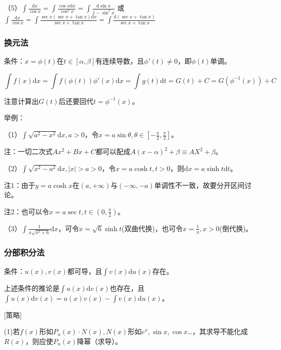 \documentclass{SCIS2020cn}
\begin{document}
（5）$\displaystyle\int{\frac{\text{d}x}{\cos{x}}}=\int{\frac{\cos{x}\text{d}x}{\cos^2{x}}}=\int{\frac{\text{d}\sin{x}}{1-\sin^2{x}}}$
或$\displaystyle\int{\frac{\text{d}x}{\cos{x}}}=\int{\frac{\sec{x}(\sec{x}+\tan{x})\text{d}x}{\sec{x}+\tan{x}}}=\int{\frac{\text{d}(\sec{x}+\tan{x})}{\sec{x}+\tan{x}}}$

\subsubsection{换元法}
条件：$x=\phi(t)$在$t\in[\alpha{},\beta{}]$有连续导数，且$\phi'(t)\neq{}0$，即$\phi(t)$单调。

\begin{equation}
\int{f(x)\text{d}x}=\int{f(\phi(t))\phi'(x)\text{d}x}=\int{g(t)\text{d}t}=G(t)+C=G(\phi^{-1}(x))+C
\end{equation}

注意计算出$G(t)$后还要回代$t=\phi^{-1}(x)$。

举例：

（1）$\displaystyle\int{\sqrt{a^2-x^2}\text{d}x},a>0$，令$\displaystyle{}x=a\sin{\theta},\theta\in\left[-\frac{\pi}{2},\frac{\pi}{2}\right]$。

注：一切二次式$Ax^2+Bx+C$都可以配成$A(x-\alpha)^2+\beta\equiv{}{AX^2+\beta}$。

（2）$\displaystyle\int{\sqrt{x^2-a^2}\text{d}x},|x|>a>0$，令$x=a\cosh{t},t>0$，则$\text{d}x=a\sinh{t}\text{d}t$。

注1：由于$y=a\cosh{x}$在$(a,+\infty)$与$(-\infty,-a)$单调性不一致，故要分开区间讨论。

注2：也可以令$\displaystyle{}x=a\sec{t},t\in\left(0,\frac{\pi}{2}\right)$。

（3）$\displaystyle\int{\frac{1}{x\sqrt{x^2+6}}\text{d}x}$，可令$x=\sqrt{6}\sinh{t}$(双曲代换)，也可令$\displaystyle{}x=\frac{1}{u},x>0$(倒代换)。

\subsubsection{分部积分法}

条件：$\displaystyle{}u(x),v(x)$都可导，且$\displaystyle\int{v(x)\text{d}u(x)}$存在。

上述条件的推论是$\displaystyle\int{u(x)\text{d}v(x)}$也存在，且$\displaystyle\int{u(x)\text{d}v(x)}=u(x)v(x)-\int{v(x)\text{d}u(x)}$。

[策略]

(1)若$f(x)$形如$P_n(x)·N(x),N(x)$形如$e^x,\sin{x},\cos{x}$…，其求导不能化成$R(x)$，则应使$P_n(x)$降幂（求导）。
\end{document}
